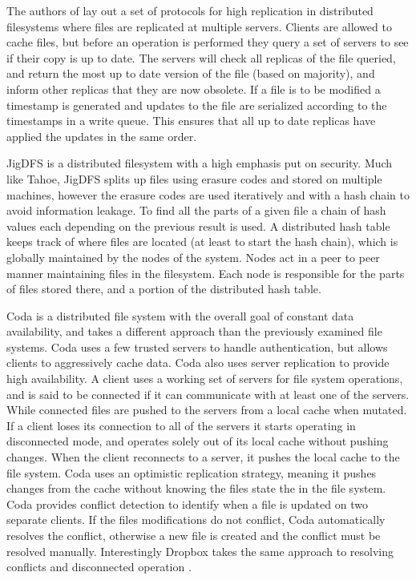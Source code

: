 The authors of \cite{Triantafillou1997} lay out a set of protocols for high
replication in distributed filesystems where files are replicated at multiple
servers. Clients are allowed to cache files, but before an operation is
performed they query a set of servers to see if their copy is up to date. The
servers will check all replicas of the file queried, and return the most up to
date version of the file (based on majority), and inform other replicas that
they are now obsolete. If a file is to be modified a timestamp is generated
and updates to the file are serialized according to the timestamps in a write
queue.  This ensures that all up to date replicas have applied the updates in
the same order.


JigDFS \cite{Bian2009} is a distributed filesystem with a high emphasis put on
security. Much like Tahoe, JigDFS splits up files using erasure codes and
stored on multiple machines, however the erasure codes are used iteratively
and with a hash chain to avoid information leakage. To find all the parts of a
given file a chain of hash values each depending on the previous result is
used. A distributed hash table keeps track of where files are located (at
least to start the hash chain), which is globally maintained by the nodes of
the system. Nodes act in a peer to peer manner maintaining files in the
filesystem. Each node is responsible for the parts of files stored there, and
a portion of the distributed hash table.


Coda \cite{Satyanarayanan1990} is a distributed file system with the overall
goal of constant data availability, and takes a different approach than the
previously examined file systems. Coda uses a few trusted servers to handle
authentication, but allows clients to aggressively cache data. Coda also uses
server replication to provide high availability. A client uses a working set
of servers for file system operations, and is said to be connected if it can
communicate with at least one of the servers. While connected files are pushed
to the servers from a local cache when mutated. If a client loses its
connection to all of the servers it starts operating in disconnected mode, and
operates solely out of its local cache without pushing changes. When the
client reconnects to a server, it pushes the local cache to the file system.
Coda uses an optimistic replication strategy, meaning it pushes changes from
the cache without knowing the files state the in the file system. Coda
provides conflict detection to identify when a file is updated on two separate
clients. If the files modifications do not conflict, Coda automatically
resolves the conflict, otherwise a new file is created and the conflict must
be resolved manually. Interestingly Dropbox takes the same approach to
resolving conflicts and disconnected operation .


